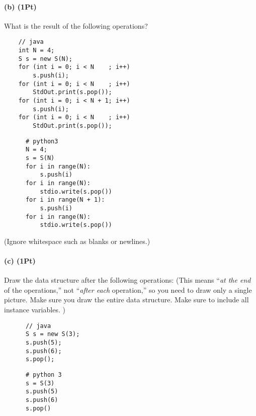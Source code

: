 \documentclass{tufte-handout}
\begin{document}
    \paragraph*{(b) (1Pt)}
      What is the result of the following operations?\\
      \begin{minipage}{7cm}
      \begin{verbatim}
	// java 
	int N = 4;	
	S s = new S(N);
	for (int i = 0; i < N    ; i++) 
	    s.push(i);
	for (int i = 0; i < N    ; i++) 
	    StdOut.print(s.pop());
	for (int i = 0; i < N + 1; i++) 
	    s.push(i);
	for (int i = 0; i < N    ; i++) 
	    StdOut.print(s.pop());
      \end{verbatim}
      \end{minipage}
%
      \begin{minipage}{7cm}
      \begin{verbatim}
      # python3
      N = 4;
      s = S(N)
      for i in range(N):
          s.push(i)
      for i in range(N):
          stdio.write(s.pop())
      for i in range(N + 1): 
          s.push(i)
      for i in range(N): 
          stdio.write(s.pop())
      \end{verbatim}
      \end{minipage}
       
      (Ignore whitespace such as blanks or newlines.)
    \paragraph*{(c) (1Pt)}      
      Draw the data structure after the following operations:
      (This means ``\emph{at the end} of the operations,''
        not ``\emph{after each} operation,''  so you need to draw only a single picture.
        Make sure you draw the entire data structure.
        Make sure to include all instance variables.
        )
      \begin{minipage}{5cm}
      \begin{verbatim}
      // java
      S s = new S(3);
      s.push(5);
      s.push(6);
      s.pop();
      \end{verbatim}
      \end{minipage}
%
      \begin{minipage}{5cm}
      \begin{verbatim}
      # python 3
      s = S(3)
      s.push(5)
      s.push(6)
      s.pop()
      \end{verbatim}
      \end{minipage}
\end{document}
